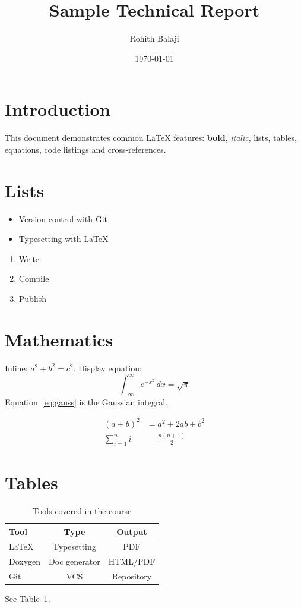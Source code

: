 \documentclass[12pt,a4paper]{article}
\title{Sample Technical Report}
\author{Rohith Balaji}
\date{\today}
\begin{document}
\maketitle
\tableofcontents
\newpage

\section{Introduction}
This document demonstrates common \LaTeX{} features: \textbf{bold}, \textit{italic},
lists, tables, equations, code listings and cross-references.

\section{Lists}
\begin{itemize}
  \item Version control with Git
  \item Typesetting with \LaTeX
\end{itemize}
\begin{enumerate}
  \item Write
  \item Compile
  \item Publish
\end{enumerate}

\section{Mathematics}
Inline: $a^2 + b^2 = c^2$. Display equation:
\begin{equation}\label{eq:gauss}
  \int_{-\infty}^{\infty} e^{-x^2}\,dx = \sqrt{\pi}
\end{equation}
Equation~\ref{eq:gauss} is the Gaussian integral.

\begin{align}
  (a+b)^2 &= a^2 + 2ab + b^2 \\
  \sum_{i=1}^{n} i &= \frac{n(n+1)}{2}
\end{align}

\section{Tables}
\begin{table}[h]
  \centering
  \begin{tabular}{lcc}
    \toprule
    Tool & Type & Output \\
    \midrule
    LaTeX   & Typesetting & PDF \\
    Doxygen & Doc generator & HTML/PDF \\
    Git     & VCS & Repository \\
    \bottomrule
  \end{tabular}
  \caption{Tools covered in the course}\label{tab:tools}
\end{table}
See Table~\ref{tab:tools}.
\end{document}
